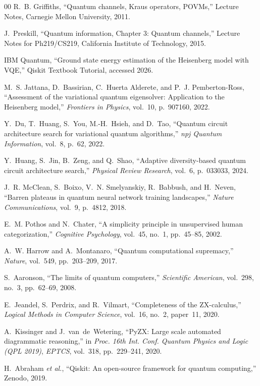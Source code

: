 \documentclass[conference]{IEEEtran}
\begin{document}
\begin{thebibliography}{00}
R.~B. Griffiths,
``Quantum channels, Kraus operators, POVMs,''
Lecture Notes, Carnegie Mellon University, 2011.

J.~Preskill,
``Quantum information, Chapter 3: Quantum channels,''
Lecture Notes for Ph219/CS219, California Institute of Technology, 2015.

IBM Quantum,
``Ground state energy estimation of the Heisenberg model with VQE,''
Qiskit Textbook Tutorial, accessed 2026.

M.~S. Jattana, D.~Bassirian, C.~Huerta Alderete, and P.~J. Pemberton-Ross,
``Assessment of the variational quantum eigensolver: Application to the Heisenberg model,''
\textit{Frontiers in Physics}, vol.~10, p.~907160, 2022.

Y.~Du, T.~Huang, S.~You, M.-H.~Hsieh, and D.~Tao,
``Quantum circuit architecture search for variational quantum algorithms,''
\textit{npj Quantum Information}, vol.~8, p.~62, 2022.

Y.~Huang, S.~Jin, B.~Zeng, and Q.~Shao,
``Adaptive diversity-based quantum circuit architecture search,''
\textit{Physical Review Research}, vol.~6, p.~033033, 2024.

J.~R. McClean, S.~Boixo, V.~N. Smelyanskiy, R.~Babbush, and H.~Neven,
``Barren plateaus in quantum neural network training landscapes,''
\textit{Nature Communications}, vol.~9, p.~4812, 2018.

E.~M. Pothos and N.~Chater,
``A simplicity principle in unsupervised human categorization,''
\textit{Cognitive Psychology}, vol.~45, no.~1, pp.~45--85, 2002.

A.~W. Harrow and A.~Montanaro,
``Quantum computational supremacy,''
\textit{Nature}, vol.~549, pp.~203--209, 2017.

S.~Aaronson,
``The limits of quantum computers,''
\textit{Scientific American}, vol.~298, no.~3, pp.~62--69, 2008.

E.~Jeandel, S.~Perdrix, and R.~Vilmart,
``Completeness of the ZX-calculus,''
\textit{Logical Methods in Computer Science}, vol.~16, no.~2, paper~11, 2020.

A.~Kissinger and J.~van~de~Wetering,
``PyZX: Large scale automated diagrammatic reasoning,''
in \textit{Proc. 16th Int. Conf. Quantum Physics and Logic (QPL 2019)},
\textit{EPTCS}, vol.~318, pp.~229--241, 2020.

H.~Abraham \textit{et al.},
``Qiskit: An open-source framework for quantum computing,''
Zenodo, 2019.


\end{thebibliography}
\end{document}

